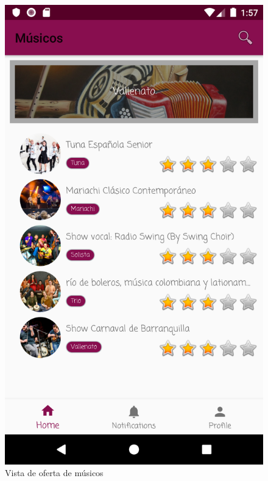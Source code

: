 \begin{figure}[hbt!]
\centering
\includegraphics[width=0.6\linewidth]{Desarrollo/Interfaces/Interfaces/imgs/list.png}
\caption{Vista de oferta de músicos}
\end{figure}
\newpage
